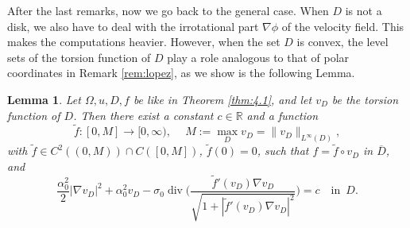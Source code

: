 \documentclass[10pt,reqno,a4paper]{article}
\numberwithin{equation}{section}
\theoremstyle{plain}
\newtheorem{lemma}[theorem]{Lemma}
\theoremstyle{definition}
\newcommand{\R}{{\mathbb R}}
\renewcommand{\div}{\operatorname{div}} %
\begin{document}
After the last remarks, now we go back to the general case.
When $D$ is not a disk, we also have to deal with the irrotational part $\nabla \phi$ of the velocity field. 
This makes the computations heavier.  
However, when the set $D$ is convex, the level sets of the torsion function of $D$ 
play a role analogous to that of polar coordinates in Remark \ref{rem:lopez}, 
as we show is the following Lemma. 

\begin{lemma} \label{lemma:tilde.f}
Let $\Omega, u, D, f$ be like in Theorem \ref{thm:4.1}, 
and let $v_D$ be the torsion function of $D$. Then there exist
a constant $c \in \R$ and a function
\[
\tilde f : [0,M] \to [0, \infty), \quad \  
M := \max_D v_D = \| v_D \|_{L^\infty(D)},
\] 
with $\tilde f \in C^{2}((0,M)) \cap C([0,M])$, 
$\tilde f(0)=0$,
such that $f = \tilde f \circ v_D$ in $\overline D$, and
\begin{equation}\label{eq:first.reduction1}
\frac{\alpha_0^2}{2} |\nabla v_D|^2 
+ \alpha_0^2 v_D 
- \sigma_0  \div \bigg( \frac{\tilde f'(v_D) \nabla v_D }{\sqrt{ 1 + | \tilde f' (v_D) \nabla v_D|^2}} \bigg) 
= c
 \quad\text{in } \, D.
\end{equation}
\end{lemma}
\end{document}
